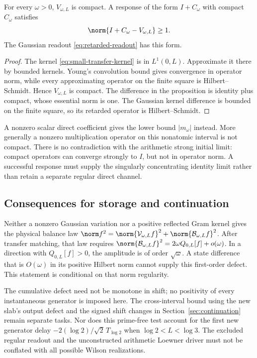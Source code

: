 \begin{proposition}
\label{prop:compact-response}
For every $\omega>0$, $V_{\omega,L}$ is compact. A response
of the form $I+C_\omega$ with compact $C_\omega$ satisfies
\[
 \norm{I+C_\omega-V_{\omega,L}}\ge1.
\]
The Gaussian readout \eqref{eq:retarded-readout} has this form.
\end{proposition}
\begin{proof}
The kernel \eqref{eq:small-transfer-kernel} is in $L^1(0,L)$.
Approximate it there by bounded kernels. Young's convolution
bound gives convergence in operator norm, while every
approximating operator on the finite square is
Hilbert--Schmidt. Hence $V_{\omega,L}$ is compact.
The difference in the proposition is identity plus compact,
whose essential norm is one. The Gaussian kernel difference
is bounded on the finite square, so its retarded operator
is Hilbert--Schmidt.
\end{proof}

A nonzero scalar direct coefficient gives the lower bound
$|m_\omega|$ instead. More generally a nonzero multiplication
operator on this nonatomic interval is not compact.
There is no contradiction with the arithmetic strong initial
limit: compact operators can converge strongly to $I$,
but not in operator norm. A successful response must supply
the singularly concentrating identity limit rather than
retain a separate regular direct channel.

\subsection{Consequences for storage and continuation}

Neither a nonzero Gaussian variation nor a positive reflected
Gram kernel gives the physical balance law
$\norm f^2=\norm{\mathcal V_{\omega,L}f}^2+
\norm{\mathcal B_{\omega,L}f}^2$.
After transfer matching, that law requires
$\norm{\mathcal B_{\omega,L}f}^2
=2\omega Q_{0,L}[f]+o(\omega)$.
In a direction with $Q_{0,L}[f]>0$, the amplitude is of order
$\sqrt\omega$. A state difference that is $O(\omega)$ in its
positive Hilbert norm cannot supply this first-order defect.
This statement is conditional on that norm regularity.

The cumulative defect need not be monotone in shift; no
positivity of every instantaneous generator is imposed here.
The cross-interval bound using the new slab's output defect
and the signed shift changes in Section~\ref{sec:continuation}
remain separate tasks. Nor does this prime-free test account
for the first new generator delay
$-2(\log2)/\sqrt2\,T_{\log2}$ when $\log2<L<\log3$.
The excluded regular readout and the unconstructed arithmetic
Loewner driver must not be conflated with all possible Wilson
realizations.
